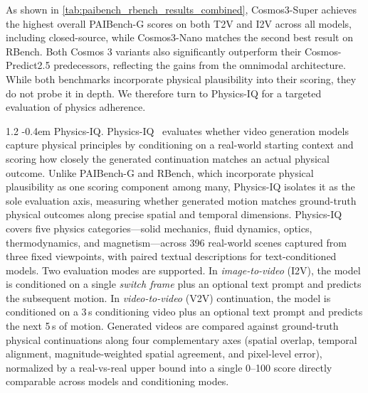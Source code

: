 \documentclass{llmxive}
\makeatletter
\providecommand{\paragraph}{  \@startsection{paragraph}{4}{\z@}    {1\baselineskip \@plus .2\baselineskip}    {-0.4em}    {\normalfont\normalsize\bfseries}}
\makeatother
\begin{document}
As shown in \cref{tab:paibench_rbench_results_combined}, Cosmos3-Super achieves the highest overall PAIBench-G scores on both T2V and I2V across all models, including closed-source, while Cosmos3-Nano matches the second best result on RBench. Both Cosmos 3 variants also significantly outperform their Cosmos-Predict2.5 predecessors, reflecting the gains from the omnimodal architecture. While both benchmarks incorporate physical plausibility into their scoring, they do not probe it in depth. We therefore turn to Physics-IQ for a targeted evaluation of physics adherence.

\paragraph{Physics-IQ.} Physics-IQ~\citep{motamed2025generative} evaluates whether video generation models capture physical principles by conditioning on a real-world starting context and scoring how closely the generated continuation matches an actual physical outcome. Unlike PAIBench-G and RBench, which incorporate physical plausibility as one scoring component among many, Physics-IQ isolates it as the sole evaluation axis, measuring whether generated motion matches ground-truth physical outcomes along precise spatial and temporal dimensions.
Physics-IQ covers five physics categories---solid mechanics, fluid dynamics, optics, thermodynamics, and magnetism---across 396 real-world scenes captured from three fixed viewpoints, with paired textual descriptions for text-conditioned models.
Two evaluation modes are supported.
In \emph{image-to-video} (I2V), the model is conditioned on a single \emph{switch frame} plus an optional text prompt and predicts the subsequent motion.
In \emph{video-to-video} (V2V) continuation, the model is conditioned on a 3\,s conditioning video plus an optional text prompt and predicts the next 5\,s of motion.
Generated videos are compared against ground-truth physical continuations along four complementary axes (spatial overlap, temporal alignment, magnitude-weighted spatial agreement, and pixel-level error), normalized by a real-vs-real upper bound into a single 0–100 score directly comparable across models and conditioning modes.
\end{document}
